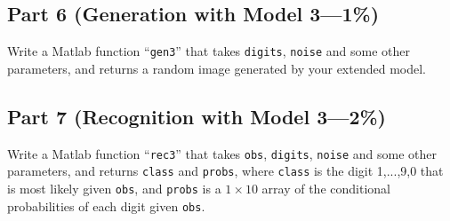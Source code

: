 \documentclass[12pt]{article}
\begin{document}
\subsection*{Part 6 \rm(Generation with Model 3---1\%)}

Write a Matlab function ``{\tt gen3}'' that takes
{\tt digits}, {\tt noise} and some other parameters,
and returns a random image generated by your extended model.


\subsection*{Part 7 \rm(Recognition with Model 3---2\%)}

Write a Matlab function ``{\tt rec3}'' that takes
{\tt obs}, {\tt digits}, {\tt noise} and some other parameters,
and returns {\tt class} and {\tt probs},
where {\tt class} is the digit 1,...,9,0 that is most likely given
{\tt obs}, and {\tt probs} is a $1\times10$ array of the conditional
probabilities of each digit given {\tt obs}.
\end{document}
